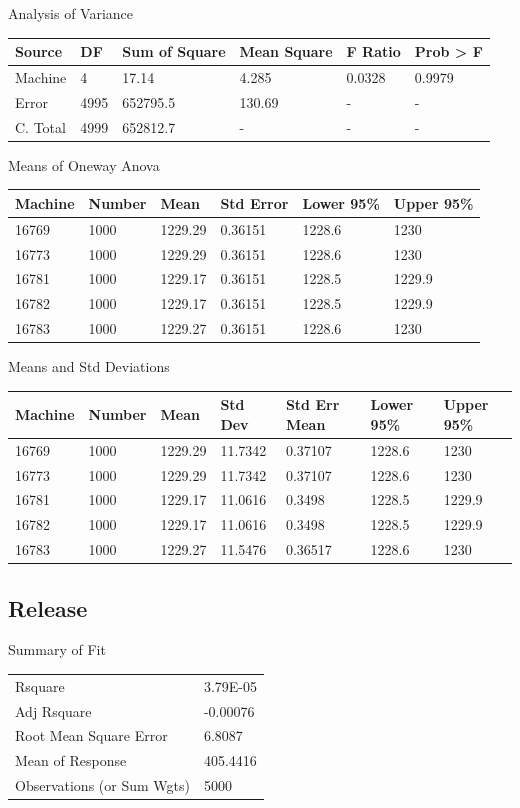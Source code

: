 \documentclass[12pt]{report}
\begin{document}
Analysis of Variance
\newline
\begin{tabular}{l | l | l | l | l | l}
Source&DF&Sum of Square&Mean Square&F Ratio&Prob > F \\
\hline
Machine&4&17.14&4.285&0.0328&0.9979 \\
Error&4995&652795.5&130.69&-&- \\
C. Total&4999&652812.7&-&-&- \\
\end{tabular}
\newline

Means of Oneway Anova
\newline
\begin{tabular}{l | l | l | l | l | l}
Machine&Number&Mean&Std Error&Lower 95\%&Upper 95\% \\
\hline
16769&1000&1229.29&0.36151&1228.6&1230 \\
16773&1000&1229.29&0.36151&1228.6&1230 \\
16781&1000&1229.17&0.36151&1228.5&1229.9 \\
16782&1000&1229.17&0.36151&1228.5&1229.9 \\
16783&1000&1229.27&0.36151&1228.6&1230 \\
\end{tabular}
\newline

Means and Std Deviations
\newline
\begin{tabular}{l | l | l | l | l | l | l}
Machine&Number&Mean&Std Dev&Std Err Mean&Lower 95\%&Upper 95\% \\
\hline
16769&1000&1229.29&11.7342&0.37107&1228.6&1230 \\
16773&1000&1229.29&11.7342&0.37107&1228.6&1230 \\
16781&1000&1229.17&11.0616&0.3498&1228.5&1229.9 \\
16782&1000&1229.17&11.0616&0.3498&1228.5&1229.9 \\
16783&1000&1229.27&11.5476&0.36517&1228.6&1230 \\
\end{tabular}
\newline

\subsection{Release}
Summary of Fit
\newline
\begin{tabular}{l | l}
  Rsquare&3.79E-05 \\
  Adj Rsquare&-0.00076 \\
  Root Mean Square Error&6.8087 \\
  Mean of Response&405.4416 \\
  Observations (or Sum Wgts)&5000 \\
\end{tabular}
\newline
  \newline
\end{document}
